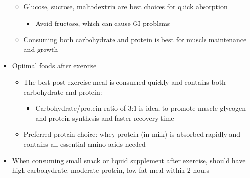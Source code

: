 \documentclass[12pt]{article}
\begin{document}
\begin{itemize}
\begin{itemize}
                        \item Glucose, sucrose, maltodextrin are best choices for quick absorption
                            \begin{itemize}
                                \item Avoid fructose, which can cause GI problems
                            \end{itemize}
                        \item Consuming both carbohydrate and protein is best for muscle maintenance and growth
                    \end{itemize}
                \item Optimal foods after exercise
                    \begin{itemize}
                        \item The best post-exercise meal is consumed quickly and contains both carbohydrate and protein:
                            \begin{itemize}
                                \item Carbohydrate/protein ratio of 3:1 is ideal to promote muscle glycogen and protein synthesis and faster recovery time
                            \end{itemize}
                        \item Preferred protein choice: whey protein (in milk) is absorbed rapidly and contains all essential amino acids needed
                    \end{itemize}
                \item When consuming small snack or liquid supplement after exercise, should have high-carbohydrate, moderate-protein, low-fat meal within 2 hours
            \end{itemize}
\end{document}
